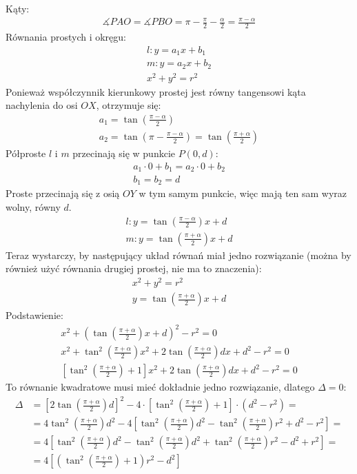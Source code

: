 \noindent Kąty:
\begin{gather*}
\measuredangle PAO = \measuredangle PBO = \pi - \frac{\pi}{2} - \frac{\alpha}{2} = \frac{\pi - \alpha}{2} 
\end{gather*}
Równania prostych i okręgu:
\begin{gather*}
l: y = a_1x + b_1 \\
m: y = a_2x + b_2 \\
x^2 + y^2 = r^2
\end{gather*}
Ponieważ współczynnik kierunkowy prostej jest równy tangensowi kąta nachylenia do osi $OX$, otrzymuje się:
\begin{gather*}
a_1 = \tan (\frac{\pi - \alpha}{2}) \\ 
a_2 = \tan (\pi - \frac{\pi - \alpha}{2}) = \tan (\frac{\pi + \alpha}{2})
\end{gather*}
Półproste $l$ i $m$ przecinają się w punkcie $P(0, d)$:
\begin{gather*}
a_1 \cdot 0 + b_1 = a_2 \cdot 0 + b_2 \\
b_1 = b_2 = d
\end{gather*}
Proste przecinają się z osią $OY$ w tym samym punkcie, więc mają ten sam wyraz wolny, równy $d$.
\begin{gather*}
l: y = \tan (\frac{\pi - \alpha}{2})x + d \\
m: y = \tan (\frac{\pi + \alpha}{2})x + d
\end{gather*}
Teraz wystarczy, by następujący układ równań miał jedno rozwiązanie (można by również użyć równania drugiej prostej, nie ma to znaczenia):
\begin{gather*}
x^2 + y^2 = r^2 \\ 
y = \tan (\frac{\pi + \alpha}{2})x + d
\end{gather*}
Podstawienie:
\begin{gather*}
x^2 + (\tan(\frac{\pi + \alpha}{2})x + d)^2 - r^2 = 0 \\
x^2 + \tan^2(\frac{\pi + \alpha}{2})x^2 + 2\tan(\frac{\pi + \alpha}{2})dx + d^2 - r^2 = 0 \\
[\tan^2(\frac{\pi + \alpha}{2}) + 1]x^2 + 2\tan(\frac{\pi + \alpha}{2})dx + d^2 - r^2 = 0
\end{gather*}
To równanie kwadratowe musi mieć dokładnie jedno rozwiązanie, dlatego $\Delta = 0$:
\begin{equation*}
\begin{split}
\Delta & = [2\tan(\frac{\pi + \alpha}{2})d]^2 - 4\cdot[\tan^2(\frac{\pi + \alpha}{2}) + 1]\cdot (d^2 - r^2) = \\
 & = 4\tan^2(\frac{\pi + \alpha}{2})d^2 - 4[\tan^2(\frac{\pi + \alpha}{2})d^2 - \tan^2(\frac{\pi + \alpha}{2})r^2 + d^2 - r^2] = \\
 & = 4[\tan^2(\frac{\pi + \alpha}{2})d^2 - \tan^2(\frac{\pi + \alpha}{2})d^2 + \tan^2(\frac{\pi + \alpha}{2})r^2 - d^2 + r^2] = \\
 & = 4[(\tan^2(\frac{\pi + \alpha}{2}) + 1)r^2 - d^2]
\end{split}
\end{equation*}
